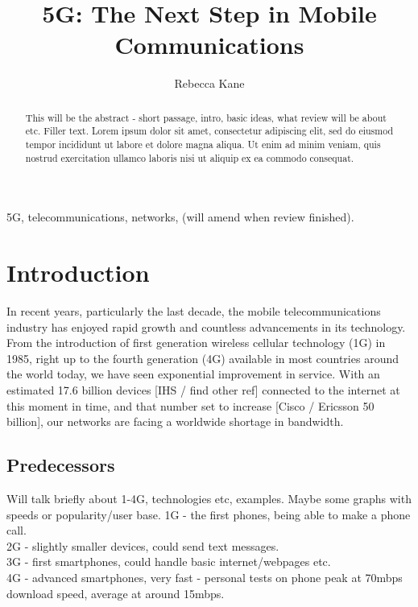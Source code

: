\documentclass[journal]{IEEEtran}
\begin{document}
\title{5G: The Next Step in Mobile Communications}
\author{Rebecca Kane}


\maketitle

\begin{abstract}
This will be the abstract - short passage, intro, basic ideas, what review will be about etc. Filler text. Lorem ipsum dolor sit amet, consectetur adipiscing elit, sed do eiusmod tempor incididunt ut labore et dolore magna aliqua. Ut enim ad minim veniam, quis nostrud exercitation ullamco laboris nisi ut aliquip ex ea commodo consequat.
\end{abstract}
\begin{IEEEkeywords}
5G, telecommunications, networks, (will amend when review finished).
\end{IEEEkeywords}


\section{Introduction}
In recent years, particularly the last decade, the mobile telecommunications industry has enjoyed rapid growth and countless advancements in its technology. From the introduction of first generation wireless cellular technology (1G) in 1985, right up to the fourth generation (4G) available in most countries around the world today, we have seen exponential improvement in service. With an estimated 17.6 billion devices [IHS / find other ref] connected to the internet at this moment in time, and that number set to increase [Cisco / Ericsson 50 billion], our networks are facing a worldwide shortage in bandwidth.

\subsection{Predecessors}
Will talk briefly about 1-4G, technologies etc, examples. Maybe some graphs with speeds or popularity/user base.
1G - the first phones, being able to make a phone call.\\
2G - slightly smaller devices, could send text messages.\\
3G - first smartphones, could handle basic internet/webpages etc.\\
4G - advanced smartphones, very fast - personal tests on phone peak at 70mbps download speed, average at around 15mbps.\\
\end{document}
